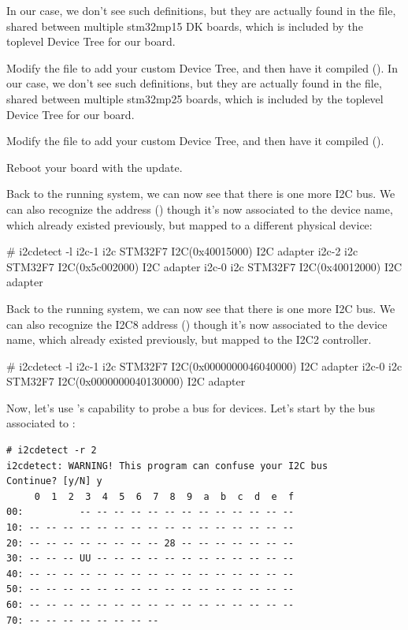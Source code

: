 \if{}
In our case, we don't see such definitions, but they are actually
found in the 
file, shared between multiple stm32mp15 DK boards, which is included
by the toplevel Device Tree for our board.

Modify the  file to add your custom
Device Tree, and then have it compiled ().
\fi
\if{}
In our case, we don't see such definitions, but they are actually
found in the 
file, shared between multiple stm32mp25 boards, which is included
by the toplevel Device Tree for our board.

Modify the  file to add your custom
Device Tree, and then have it compiled ().
\fi

Reboot your board with the update.

\if{}
Back to the running system, we can now see that there is one more
I2C bus. We can also recognize the \busname address ()
though it's now associated to the  device name, which
already existed previously, but mapped to a different physical device:

\begin{bashinput}
# i2cdetect -l
i2c-1	i2c             STM32F7 I2C(0x40015000)                 I2C adapter
i2c-2	i2c             STM32F7 I2C(0x5c002000)                 I2C adapter
i2c-0	i2c             STM32F7 I2C(0x40012000)                 I2C adapter
\end{bashinput}
\fi
\if{}
Back to the running system, we can now see that there is one more
I2C bus. We can also recognize the I2C8 address ()
though it's now associated to the  device name, which
already existed previously, but mapped to the I2C2 controller.

\begin{bashinput}
# i2cdetect -l
i2c-1	i2c       	STM32F7 I2C(0x0000000046040000) 	I2C adapter
i2c-0	i2c       	STM32F7 I2C(0x0000000040130000) 	I2C adapter
\end{bashinput}
\fi

\if{}
Now, let's use 's capability to probe a bus for devices.
Let's start by the bus associated to :

\begin{verbatim}
# i2cdetect -r 2
i2cdetect: WARNING! This program can confuse your I2C bus
Continue? [y/N] y
     0  1  2  3  4  5  6  7  8  9  a  b  c  d  e  f
00:          -- -- -- -- -- -- -- -- -- -- -- -- --
10: -- -- -- -- -- -- -- -- -- -- -- -- -- -- -- --
20: -- -- -- -- -- -- -- -- 28 -- -- -- -- -- -- --
30: -- -- -- UU -- -- -- -- -- -- -- -- -- -- -- --
40: -- -- -- -- -- -- -- -- -- -- -- -- -- -- -- --
50: -- -- -- -- -- -- -- -- -- -- -- -- -- -- -- --
60: -- -- -- -- -- -- -- -- -- -- -- -- -- -- -- --
70: -- -- -- -- -- -- -- --
\end{verbatim}

